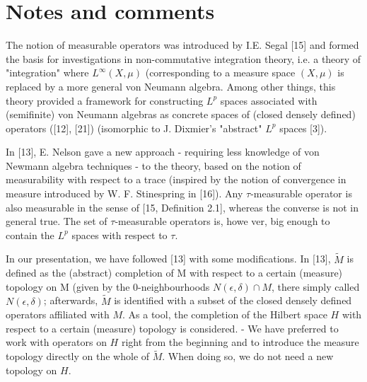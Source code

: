 \section{Notes and comments}
The notion of measurable operators was introduced by I.E. Segal [15] and formed the basis for investigations in non-commutative integration theory, i.e. a theory of "integration" where $L^\infty(X,\mu)$ (corresponding to a measure space $(X,\mu)$ is replaced by a more general von Neumann algebra. Among other things, this theory provided a framework for constructing $L^p$ spaces associated with (semifinite) von Neumann algebras as concrete spaces of (closed densely defined) operators ([12], [21]) (isomorphic to J. Dixmier's "abstract" $L^p$ spaces [3]).\par
In [13], E. Nelson gave a new approach - requiring less knowledge of von Newmann algebra techniques - to the theory, based on the notion of measurability with respect to a trace (inspired by the notion of convergence in measure introduced by W. F. Stinespring in [16]). Any $\tau$-measurable operator is also measurable in the sense of [15, Definition 2.1], whereas the converse is not in general true. The set of $\tau$-measurable operators is, howe ver, big enough to contain the $L^p$ spaces with respect to $\tau$.\par
In our presentation, we have followed [13] with some modifications. In [13], $\widetilde{M}$ is defined as the (abstract) completion of M with respect to a certain (measure) topology on M (given by the $0$-neighbourhoods $N(\epsilon,\delta)\cap M$, there simply called $N(\epsilon,\delta)$; afterwards, $\widetilde{M}$ is identified with a subset of the closed densely defined operators affiliated with $M$. As a tool, the completion of the Hilbert space $H$ with respect to a certain (measure) topology is considered. - We have preferred to work with operators on $H$ right from the beginning and to introduce the measure topology directly on the whole of $\widetilde{M}$. When doing so, we do not need a new topology on $H$.
% 